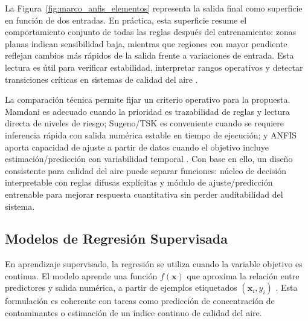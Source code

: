La Figura~\ref{fig:marco_anfis_elementos} representa la salida final como superficie en función de dos entradas. En práctica, esta superficie resume el comportamiento conjunto de todas las reglas después del entrenamiento: zonas planas indican sensibilidad baja, mientras que regiones con mayor pendiente reflejan cambios más rápidos de la salida frente a variaciones de entrada. Esta lectura es útil para verificar estabilidad, interpretar rangos operativos y detectar transiciones críticas en sistemas de calidad del aire \cite{A084,A135,A149,ARTFZ02}.


La comparación técnica permite fijar un criterio operativo para la propuesta. Mamdani es adecuado cuando la prioridad es trazabilidad de reglas y lectura directa de niveles de riesgo; Sugeno/TSK es conveniente cuando se requiere inferencia rápida con salida numérica estable en tiempo de ejecución; y ANFIS aporta capacidad de ajuste a partir de datos cuando el objetivo incluye estimación/predicción con variabilidad temporal \cite{ART03,ART04,ART06,A084,A149}. Con base en ello, un diseño consistente para calidad del aire puede separar funciones: núcleo de decisión interpretable con reglas difusas explícitas y módulo de ajuste/predicción entrenable para mejorar respuesta cuantitativa sin perder auditabilidad del sistema.

\subsection{Modelos de Regresión Supervisada}
En aprendizaje supervisado, la regresión se utiliza cuando la variable objetivo es continua. El modelo aprende una función \(f(\mathbf{x})\) que aproxima la relación entre predictores y salida numérica, a partir de ejemplos etiquetados \((\mathbf{x}_i, y_i)\) \cite{ARTML01}. Esta formulación es coherente con tareas como predicción de concentración de contaminantes o estimación de un índice continuo de calidad del aire.

